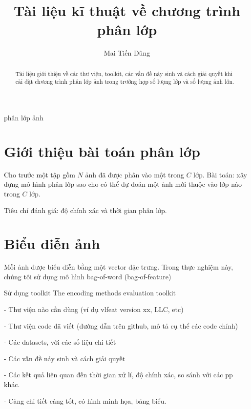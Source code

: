 \documentclass[review]{elsarticle}
\begin{document}
\begin{frontmatter}

\title{Tài liệu kĩ thuật về chương trình phân lớp}


\author{Mai Tiến Dũng}
\address{Radarweg 29, Amsterdam}

\begin{abstract}
Tài liệu giới thiệu về các thư viện, toolkit, các vấn đề nảy sinh và cách giải quyết khi cài đặt chương trình phân lớp ảnh trong trường hợp số lượng lớp và số lượng ảnh lớn.
\end{abstract}

\begin{keyword}
phân lớp ảnh
\end{keyword}

\end{frontmatter}

\linenumbers

\section{Giới thiệu bài toán phân lớp}
Cho trước một tập gồm $N$ ảnh đã được phân vào một trong $C$ lớp.
Bài toán: xây dựng mô hình phân lớp sao cho có thể dự đoán một ảnh mới thuộc vào lớp nào trong $C$ lớp.

Tiêu chí đánh giá: độ chính xác và thời gian phân lớp.

\section{Biểu diễn ảnh}

Mỗi ảnh được biểu diễn bằng một vector đặc trưng. Trong thực nghiệm này, chúng tôi sử dụng mô hình bag-of-word (bag-of-feature)



Sử dụng toolkit The encoding methods evaluation toolkit 

- Thư viện nào cần dùng (ví dụ vlfeat version xx, LLC, etc)

- Thư viện code đã viết (đường dẫn trên github, mô tả cụ thể các code chính)

- Các datasets, với các số liệu chi tiết

- Các vấn đề nảy sinh và cách giải quyết

- Các kết quả liên quan đến thời gian xử lí, độ chính xác, so sánh với các pp khác.

- Càng chi tiết càng tốt, có hình minh họa, bảng biểu.
\end{document}
